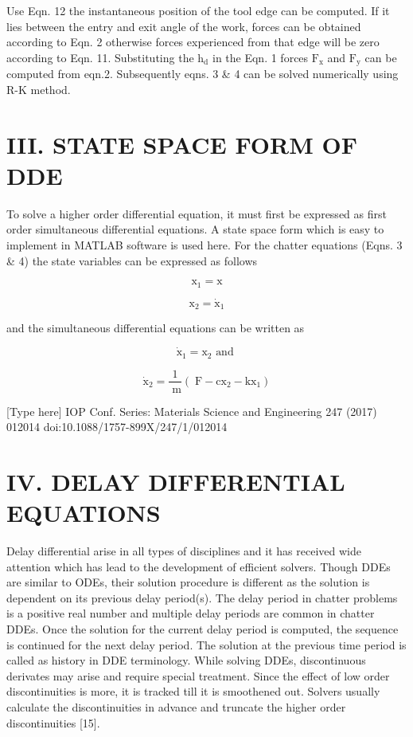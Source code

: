 \documentclass[10pt]{article}
\begin{document}
Use Eqn. 12 the instantaneous position of the tool edge can be computed. If it lies between the entry and exit angle of the work, forces can be obtained according to Eqn. 2 otherwise forces experienced from that edge will be zero according to Eqn. 11. Substituting the \({\mathrm{h}}_{\mathrm{d}}\) in the Eqn. 1 forces \({\mathrm{F}}_{\mathrm{x}}\) and \({\mathrm{F}}_{\mathrm{y}}\) can be computed from eqn.2. Subsequently eqns. 3 \& 4 can be solved numerically using R-K method.

\section*{III. STATE SPACE FORM OF DDE}

To solve a higher order differential equation, it must first be expressed as first order simultaneous differential equations. A state space form which is easy to implement in MATLAB software is used here. For the chatter equations (Eqns. 3 \& 4) the state variables can be expressed as follows

\[
{\mathrm{x}}_{1} = \mathrm{x} \tag{13}
\]

\[
{\mathrm{x}}_{2} = {\dot{\mathrm{x}}}_{1} \tag{14}
\]

and the simultaneous differential equations can be written as

\[
{\dot{\mathrm{x}}}_{1} = {\mathrm{x}}_{2}\text{ and } \tag{15}
\]

\[
{\dot{\mathrm{x}}}_{2} = \frac{1}{\mathrm{\;m}}\left( {\mathrm{\;F} - {\mathrm{{cx}}}_{2} - {\mathrm{{kx}}}_{1}}\right)  \tag{16}
\]

[Type here] IOP Conf. Series: Materials Science and Engineering 247 (2017) 012014 doi:10.1088/1757-899X/247/1/012014

\section*{IV. DELAY DIFFERENTIAL EQUATIONS}

Delay differential arise in all types of disciplines and it has received wide attention which has lead to the development of efficient solvers. Though DDEs are similar to ODEs, their solution procedure is different as the solution is dependent on its previous delay period(s). The delay period in chatter problems is a positive real number and multiple delay periods are common in chatter DDEs. Once the solution for the current delay period is computed, the sequence is continued for the next delay period. The solution at the previous time period is called as history in DDE terminology. While solving DDEs, discontinuous derivates may arise and require special treatment. Since the effect of low order discontinuities is more, it is tracked till it is smoothened out. Solvers usually calculate the discontinuities in advance and truncate the higher order discontinuities [15].
\end{document}
